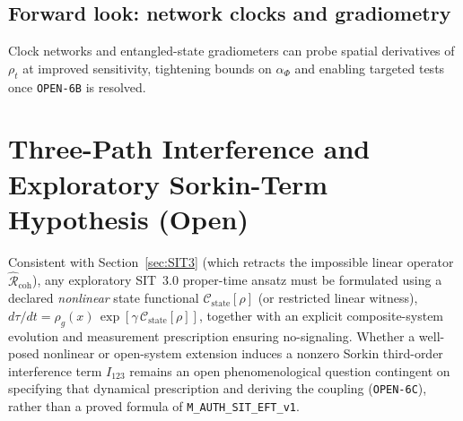 \subsection{Forward look: network clocks and gradiometry}
Clock networks and entangled-state gradiometers can probe spatial derivatives of \(\rho_t\) at improved sensitivity, tightening bounds on \(\alpha_\Phi\) and enabling targeted tests once \texttt{OPEN-6B} is resolved.

\section{Three-Path Interference and Exploratory Sorkin-Term Hypothesis (Open)}
\label{sec:three-path-born}
Consistent with Section~\ref{sec:SIT3} (which retracts the impossible linear operator $\hat{\mathcal{R}}_{\mathrm{coh}}$), any exploratory SIT~3.0 proper-time ansatz must be formulated using a declared \emph{nonlinear} state functional $\mathcal{C}_{\mathrm{state}}[\rho]$ (or restricted linear witness), $d\tau/dt = \rho_g(x)\,\exp[\gamma\,\mathcal{C}_{\mathrm{state}}[\rho]]$, together with an explicit composite-system evolution and measurement prescription ensuring no-signaling. Whether a well-posed nonlinear or open-system extension induces a nonzero Sorkin third-order interference term $I_{123}$ remains an open phenomenological question contingent on specifying that dynamical prescription and deriving the coupling (\texttt{OPEN-6C}), rather than a proved formula of \texttt{M\_AUTH\_SIT\_EFT\_v1}.

